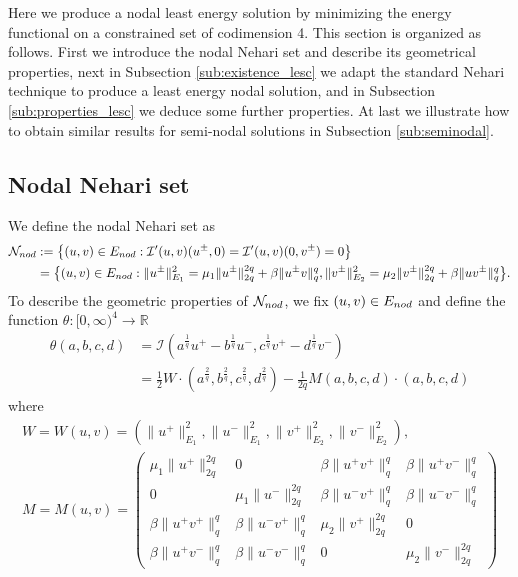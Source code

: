 \documentclass[10pt,a4paper]{amsart}
\numberwithin{equation}{section}
\begin{document}
Here we produce a nodal least energy solution by minimizing the energy functional on
a constrained set of codimension 4.
This section is organized as follows. First we introduce the nodal Nehari set and
describe its geometrical properties, next in Subsection \ref{sub:existence_lesc}
we adapt the standard Nehari technique to produce a least energy nodal solution,
and in Subsection \ref{sub:properties_lesc} we deduce some further properties.
At last we illustrate how to obtain similar results for semi-nodal solutions in
Subsection \ref{sub:seminodal}.

\subsection{Nodal Nehari set}
We define the nodal Nehari set as
\begin{equation} \label{def:Neharinod}
 \begin{aligned}
 \mathcal N_{\rm nod}&:=  \big\{ (u,v)\in E_{\rm nod}  :
 \mathcal I'(u,v)(u^{\pm},0)= \mathcal I'(u,v) (0,v^{\pm})=0 \big\}\\
 &=  \big\{ (u,v)\in E_{\rm nod}  : \|u^{\pm}\|_{E_1}^2= \mu_1 \|u^{\pm}\|_{2q}^{2q}
  + \beta \|u^{\pm} v\|_{q}^q,
  \|v^{\pm}\|_{E_2}^2= \mu_2 \|v^{\pm}\|_{2q}^{2q} + \beta \|u v^{\pm} \|_{q}^q \big\}.
\end{aligned}
\end{equation}
To describe the geometric properties of $\mathcal N_{\rm nod}$,
we fix  $(u,v)\in  E_{\rm nod}$ and define the function $\theta:[0,\infty)^4 \to \mathbb{R}$
\begin{equation} \label{def:theta}
\begin{aligned}
 \theta(a,b,c,d)
& = \mathcal I (a^{\frac{1}{q}} u^+ -b^{\frac{1}q} u^-, c^{\frac{1}q} v^+ -d^{\frac{1}q} v^-)
\\
& = \frac{1}2  W \cdot (a^{\frac{2}{q}} , b^{\frac{2}q} ,
c^{\frac{2}q} ,d^{\frac{2}q} ) - \frac{1}{2q} M (a,b,c,d) \cdot (a,b,c,d)
\end{aligned}
\end{equation}
where
\begin{gather}\label{def:W}
 W=W(u,v)= \left( \|u^+\|_{E_1}^2 , \|u^-\|_{E_1}^2 , \|v^+\|_{E_2}^2 ,
 \|v^-\|_{E_2}^2 \right), \\
\label{def:M}
 M=M(u,v)= \begin{pmatrix}
 \mu_1\|u^+\|_{2q}^{2q} & 0 & \beta \|u^+v^+\|_q^q & \beta \|u^+v^-\|_q^q\\
 0&  \mu_1\|u^-\|_{2q}^{2q} & \beta \|u^-v^+\|_q^q & \beta \|u^-v^-\|_q^q\\
 \beta \|u^+v^+\|_q^q & \beta \|u^-v^+\|_q^q &  \mu_2 \|v^+\|_{2q}^{2q} & 0 \\
 \beta \|u^+v^-\|_q^q& \beta \|u^-v^-\|_q^q& 0& \mu_2\|v^-\|_{2q}^{2q}
 \end{pmatrix}
\end{gather}
\end{document}
